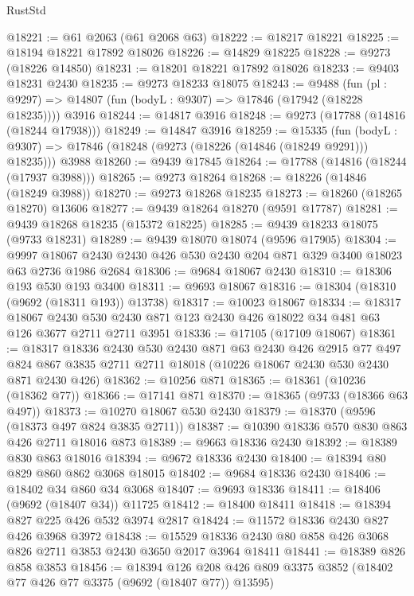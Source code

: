 \begin{lexlean}{RustStd}
\begin{coremodule}
@18221 := @61 @2063 (@61 @2068 @63)
@18222 := @18217 @18221
@18225 := @18194 @18221 @17892 @18026
@18226 := @14829 @18225
@18228 := @9273 (@18226 @14850)
@18231 := @18201 @18221 @17892 @18026
@18233 := @9403 @18231 @2430
@18235 := @9273 @18233 @18075
@18243 := @9488
    (fun (pl : @9297) => @14807 (fun (bodyL : @9307) => @17846 (@17942 (@18228 @18235))))
    @3916
@18244 := @14817 @3916
@18248 := @9273 (@17788 (@14816 (@18244 @17938)))
@18249 := @14847 @3916
@18259 := @15335
    (fun (bodyL : @9307) => @17846 (@18248 (@9273 (@18226 (@14846 (@18249 @9291))) @18235)))
    @3988
@18260 := @9439 @17845
@18264 := @17788 (@14816 (@18244 (@17937 @3988)))
@18265 := @9273 @18264
@18268 := @18226 (@14846 (@18249 @3988))
@18270 := @9273 @18268 @18235
@18273 := @18260 (@18265 @18270) @13606
@18277 := @9439 @18264 @18270 (@9591 @17787)
@18281 := @9439 @18268 @18235 (@15372 @18225)
@18285 := @9439 @18233 @18075 (@9733 @18231)
@18289 := @9439 @18070 @18074 (@9596 @17905)
@18304 := @9997 @18067 @2430 @2430 @426 @530 @2430 @204 @871 @329 @3400 @18023 @63 @2736 @1986 @2684
@18306 := @9684 @18067 @2430
@18310 := @18306 @193 @530 @193 @3400
@18311 := @9693 @18067
@18316 := @18304 (@18310 (@9692 (@18311 @193)) @13738)
@18317 := @10023 @18067
@18334 := @18317
    @18067
    @2430
    @530
    @2430
    @871
    @123
    @2430
    @426
    @18022
    @34
    @481
    @63
    @126
    @3677
    @2711
    @2711
    @3951
@18336 := @17105 (@17109 @18067)
@18361 := @18317
    @18336
    @2430
    @530
    @2430
    @871
    @63
    @2430
    @426
    @2915
    @77
    @497
    @824
    @867
    @3835
    @2711
    @2711
    @18018
    (@10226 @18067 @2430 @530 @2430 @871 @2430 @426)
@18362 := @10256 @871
@18365 := @18361 (@10236 (@18362 @77))
@18366 := @17141 @871
@18370 := @18365 (@9733 (@18366 @63 @497))
@18373 := @10270 @18067 @530 @2430
@18379 := @18370 (@9596 (@18373 @497 @824 @3835 @2711))
@18387 := @10390 @18336 @570 @830 @863 @426 @2711 @18016 @873
@18389 := @9663 @18336 @2430
@18392 := @18389 @830 @863 @18016
@18394 := @9672 @18336 @2430
@18400 := @18394 @80 @829 @860 @862 @3068 @18015
@18402 := @9684 @18336 @2430
@18406 := @18402 @34 @860 @34 @3068
@18407 := @9693 @18336
@18411 := @18406 (@9692 (@18407 @34)) @11725
@18412 := @18400 @18411
@18418 := @18394 @827 @225 @426 @532 @3974 @2817
@18424 := @11572 @18336 @2430 @827 @426 @3968 @3972
@18438 := @15529 @18336 @2430 @80 @858 @426 @3068 @826 @2711 @3853 @2430 @3650 @2017 @3964 @18411
@18441 := @18389 @826 @858 @3853
@18456 := @18394
    @126
    @208
    @426
    @809
    @3375
    @3852
    (@18402 @77 @426 @77 @3375 (@9692 (@18407 @77)) @13595)

\end{coremodule}
\end{lexlean}
